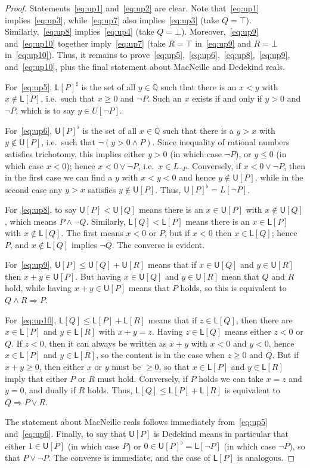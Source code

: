 \documentclass{article}
\def\Q{\mathbb{Q}}
\def\upp#1{{#1}^{\sharp}}
\def\low#1{{#1}^{\flat}}
\def\U[#1]{\mathsf{U}[#1]}
\def\L[#1]{\mathsf{L}[#1]}
\let\implies\Rightarrow
\begin{document}
\begin{proof}
  Statements~\eqref{eq:up1} and~\eqref{eq:up2} are clear.
  Note that~\eqref{eq:up1} implies~\eqref{eq:up3}, while~\eqref{eq:up7} also implies~\eqref{eq:up3} (take $Q=\top$).
  Similarly,~\eqref{eq:up8} implies~\eqref{eq:up4} (take $Q=\bot$).
  Moreover,~\eqref{eq:up9} and~\eqref{eq:up10} together imply~\eqref{eq:up7} (take $R=\top$ in~\eqref{eq:up9} and $R=\bot$ in~\eqref{eq:up10}).
  Thus, it remains to prove~\eqref{eq:up5},~\eqref{eq:up6},~\eqref{eq:up8},~\eqref{eq:up9}, and~\eqref{eq:up10}, plus the final statement about MacNeille and Dedekind reals.

  For~\eqref{eq:up5}, $\upp{\L[P]}$ is the set of all $y\in \Q$ such that there is an $x<y$ with $x\notin \L[P]$, i.e.\ such that $x\ge 0$ and $\neg P$.
  Such an $x$ exists if and only if $y>0$ and $\neg P$, which is to say $y\in U[\neg P]$.

  For~\eqref{eq:up6}, $\low{\U[P]}$ is the set of all $x\in \Q$ such that there is a $y>x$ with $y\notin \U[P]$, i.e.\ such that $\neg (y>0 \land P)$.
  Since inequality of rational numbers satisfies trichotomy, this implies either $y>0$ (in which case $\neg P$), or $y\le 0$ (in which case $x<0$); hence $x<0 \lor \neg P$, i.e.\ $x\in L_{\neg P}$.
  Conversely, if $x<0 \lor \neg P$, then in the first case we can find a $y$ with $x<y<0$ and hence $y\notin \U[P]$, while in the second case any $y>x$ satisfies $y\notin \U[P]$.
  Thus, $\low{\U[P]} = L[\neg P]$.

  For~\eqref{eq:up8}, to say $\U[P] < \U[Q]$ means there is an $x\in \U[P]$ with $x\notin \U[Q]$, which means $P\land \neg Q$.
  Similarly, $\L[Q] < \L[P]$ means there is an $x\in \L[P]$ with $x\notin \L[Q]$.
  The first means $x<0$ or $P$, but if $x<0$ then $x\in \L[Q]$; hence $P$, and $x\notin \L[Q]$ implies $\neg Q$.
  The converse is evident.

  For~\eqref{eq:up9}, $\U[P] \le \U[Q] + \U[R]$ means that if $x\in \U[Q]$ and $y\in \U[R]$ then $x+y\in\U[P]$.
  But having $x\in \U[Q]$ and $y\in \U[R]$ mean that $Q$ and $R$ hold, while having $x+y\in\U[P]$ means that $P$ holds, so this is equivalent to $Q\land R \implies P$.

  For~\eqref{eq:up10}, $\L[Q] \le \L[P] + \L[R]$ means that if $z\in \L[Q]$, then there are $x\in \L[P]$ and $y\in \L[R]$ with $x+y=z$.
  Having $z\in \L[Q]$ means either $z<0$ or $Q$.
  If $z<0$, then it can always be written as $x+y$ with $x<0$ and $y<0$, hence $x\in \L[P]$ and $y\in \L[R]$, so the content is in the case when $z\ge 0$ and $Q$.
  But if $x+y\ge 0$, then either $x$ or $y$ must be $\ge 0$, so that $x\in \L[P]$ and $y\in \L[R]$ imply that either $P$ or $R$ must hold.
  Conversely, if $P$ holds we can take $x=z$ and $y=0$, and dually if $R$ holds.
  Thus, $\L[Q] \le \L[P] + \L[R]$ is equivalent to $Q\implies P\lor R$.

  The statement about MacNeille reals follows immediately from~\eqref{eq:up5} and~\eqref{eq:up6}.
  Finally, to say that $\U[P]$ is Dedekind means in particular that either $1\in \U[P]$ (in which case $P$) or $0\in \low{\U[P]} = \L[\neg P]$ (in which case $\neg P$), so that $P\lor\neg P$.
  The converse is immediate, and the case of $\L[P]$ is analogous.
\end{proof}
\end{document}
